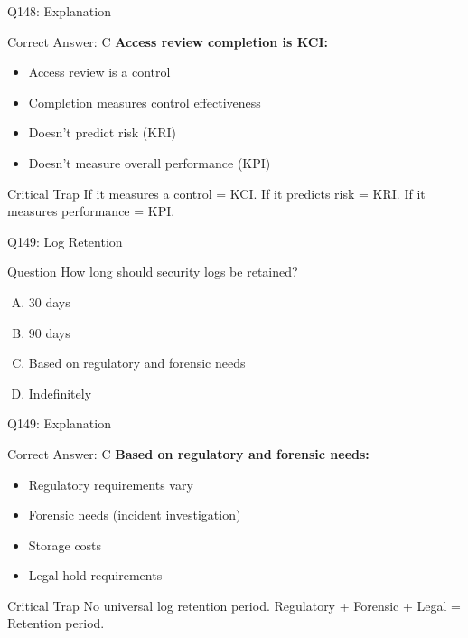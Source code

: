 \documentclass{beamer}
\begin{document}
	\begin{frame}{Q148: Explanation}
		\begin{block}{Correct Answer: C}
			\textbf{Access review completion is KCI:}
			\begin{itemize}
				\item Access review is a control
				\item Completion measures control effectiveness
				\item Doesn't predict risk (KRI)
				\item Doesn't measure overall performance (KPI)
			\end{itemize}
		\end{block}
		\begin{alertblock}{Critical Trap}
			If it measures a control = KCI.
			If it predicts risk = KRI.
			If it measures performance = KPI.
		\end{alertblock}
	\end{frame}
	
	\begin{frame}{Q149: Log Retention}
		\begin{block}{Question}
			How long should security logs be retained?
		\end{block}
		\begin{enumerate}[(A)]
			\item 30 days
			\item 90 days
			\item Based on regulatory and forensic needs
			\item Indefinitely
		\end{enumerate}
	\end{frame}
	
	\begin{frame}{Q149: Explanation}
		\begin{block}{Correct Answer: C}
			\textbf{Based on regulatory and forensic needs:}
			\begin{itemize}
				\item Regulatory requirements vary
				\item Forensic needs (incident investigation)
				\item Storage costs
				\item Legal hold requirements
			\end{itemize}
		\end{block}
		\begin{alertblock}{Critical Trap}
			No universal log retention period.
			Regulatory + Forensic + Legal = Retention period.
		\end{alertblock}
	\end{frame}
	
\end{document}
